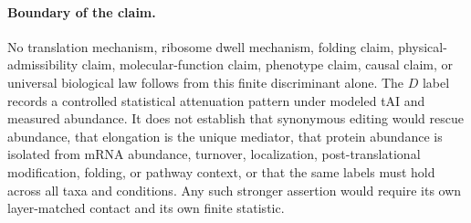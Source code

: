 \paragraph{Boundary of the claim.}
No translation mechanism, ribosome dwell mechanism, folding claim, physical-admissibility claim, molecular-function claim, phenotype claim, causal claim, or universal biological law follows from this finite discriminant alone.  The $D$ label records a controlled statistical attenuation pattern under modeled tAI and measured abundance.  It does not establish that synonymous editing would rescue abundance, that elongation is the unique mediator, that protein abundance is isolated from mRNA abundance, turnover, localization, post-translational modification, folding, or pathway context, or that the same labels must hold across all taxa and conditions.  Any such stronger assertion would require its own layer-matched contact and its own finite statistic.